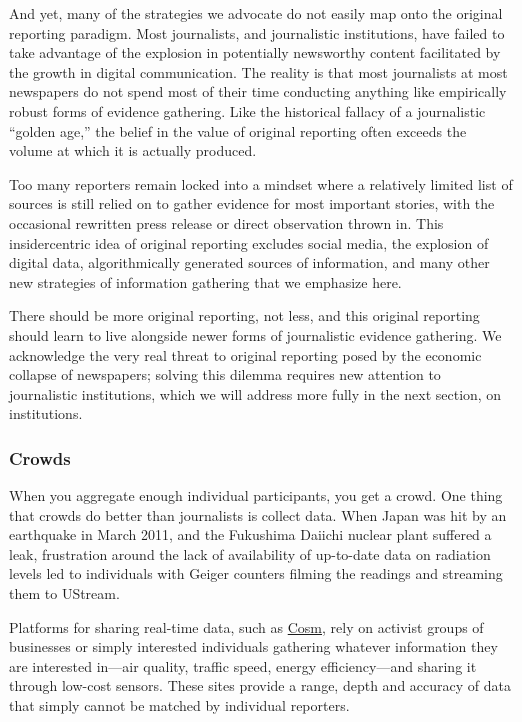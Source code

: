 And yet, many of the strategies we advocate do not easily map onto the original
reporting paradigm. Most journalists, and journalistic institutions, have failed to
take advantage of the explosion in potentially newsworthy content facilitated by
the growth in digital communication. The reality is that most journalists at most
newspapers do not spend most of their time conducting anything like empirically
robust forms of evidence gathering. Like the historical fallacy of a journalistic
``golden age,'' the belief in the value of original reporting often exceeds the
volume at which it is actually produced.

Too many reporters remain locked into a mindset where a relatively limited list
of sources is still relied on to gather evidence for most important stories, with the
occasional rewritten press release or direct observation thrown in. This insidercentric
idea of original reporting excludes social media, the explosion of digital
data, algorithmically generated sources of information, and many other new
strategies of information gathering that we emphasize here.

There should be more original reporting, not less, and this original reporting
should learn to live alongside newer forms of journalistic evidence gathering.
We acknowledge the very real threat to original reporting posed by the economic
collapse of newspapers; solving this dilemma requires new attention to
journalistic institutions, which we will address more fully in the next section,
on institutions.

\subsubsection{Crowds}

When you aggregate enough individual participants, you get a crowd. One thing
that crowds do better than journalists is collect data. When Japan was hit by an
earthquake in March 2011, and the Fukushima Daiichi nuclear plant suffered a
leak, frustration around the lack of availability of up-to-date data on radiation
levels led to individuals with Geiger counters filming the readings and streaming
them to UStream.

Platforms for sharing real-time data, such as \href{https://cosm.com/}{Cosm}, rely on activist groups of businesses
or simply interested individuals gathering whatever information they are
interested in—air quality, traffic speed, energy efficiency—and sharing it through
low-cost sensors. These sites provide a range, depth and accuracy of data that
simply cannot be matched by individual reporters.

